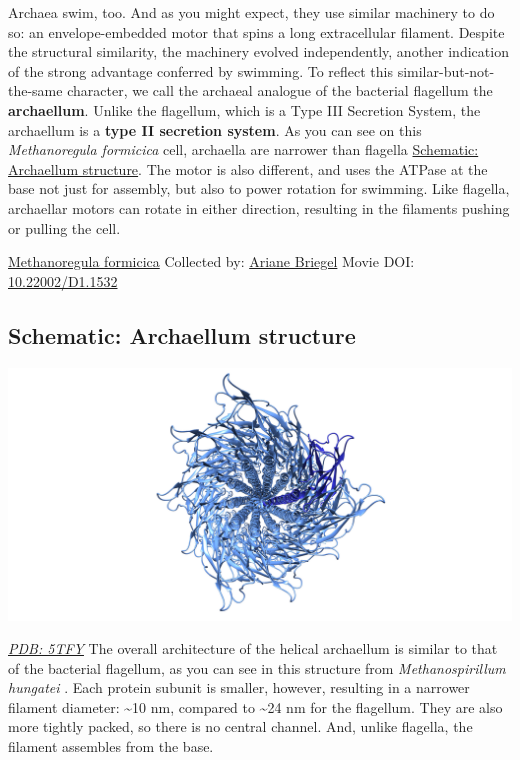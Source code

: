 \documentclass[]{tufte-book}
\begin{document}
Archaea swim, too. And as you might expect, they use similar machinery to do so: an envelope-embedded motor that spins a long extracellular filament. Despite the structural similarity, the machinery evolved independently, another indication of the strong advantage conferred by swimming. To reflect this similar-but-not-the-same character, we call the archaeal analogue of the bacterial flagellum the \textbf{archaellum}. Unlike the flagellum, which is a Type III Secretion System, the archaellum is a \textbf{type II secretion system}. As you can see on this \emph{Methanoregula formicica} cell, archaella are narrower than flagella \protect\hyperlink{Archaellum_structure}{Schematic: Archaellum structure}. The motor is also different, and uses the ATPase at the base not just for assembly, but also to power rotation for swimming. Like flagella, archaellar motors can rotate in either direction, resulting in the filaments pushing or pulling the cell.



\hypertarget{htmlwidget-e1f3bc5b54f541ab449f}{}

\label{fig:6-8}\protect\hyperlink{tree}{Methanoregula formicica} Collected by: \protect\hyperlink{ariane_briegel}{Ariane Briegel} Movie DOI: \href{https://doi.org/10.22002/D1.1532}{10.22002/D1.1532}

\hypertarget{Archaellum_structure}{%
\subsection*{Schematic: Archaellum structure}\label{Archaellum_structure}}

\includegraphics{img/schematics/6_8_1}

\href{http://rcsb.org/structure/5TFY}{\emph{PDB: 5TFY}}
The overall architecture of the helical archaellum is similar to that of the bacterial flagellum, as you can see in this structure from \emph{Methanospirillum hungatei} \citep{poweleit2016}. Each protein subunit is smaller, however, resulting in a narrower filament diameter: \textasciitilde{}10 nm, compared to \textasciitilde{}24 nm for the flagellum. They are also more tightly packed, so there is no central channel. And, unlike flagella, the filament assembles from the base.
\end{document}
